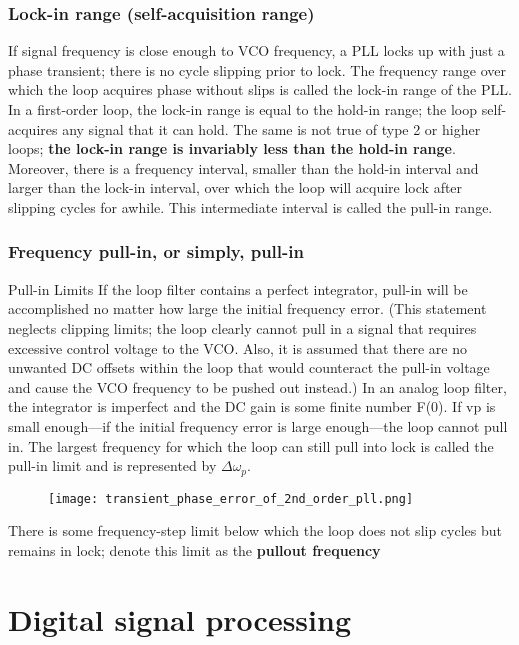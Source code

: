 \documentclass[a4paper]{article}
\begin{document}
\subsubsection{Lock-in range (self-acquisition range)}

If signal frequency is close enough to VCO frequency, a PLL locks up with
just a phase transient; there is no cycle slipping prior to lock. The frequency range over which the loop acquires phase without slips is called the lock-in range of the PLL. In a first-order loop, the lock-in range is equal to the hold-in range; the loop self-acquires any signal that it can hold. The same is not true of type 2 or higher loops; \textbf{the lock-in range is invariably less than the hold-in range}. Moreover, there is a frequency interval, smaller than the hold-in interval
and larger than the lock-in interval, over which the loop will acquire lock after slipping cycles for awhile. This intermediate interval is called the pull-in range.

\subsubsection{Frequency pull-in, or simply, pull-in}

Pull-in Limits If the loop filter contains a perfect integrator, pull-in will be accomplished no matter how large the initial frequency error. (This statement neglects clipping limits; the loop clearly cannot pull in a signal that requires excessive control voltage to the VCO. Also, it is assumed that there are no unwanted DC offsets within the loop that would counteract the pull-in voltage and cause the VCO frequency to be pushed out instead.) In an analog loop filter, the integrator is imperfect and the DC gain is some finite number F(0). If vp is small enough—if the initial frequency error is large enough—the loop cannot pull in. The largest frequency for which the loop can still pull into lock is called the pull-in limit and is represented by $\Delta\omega_p$.

\begin{figure}[h!]
	\centering
	\texttt{[image: transient\_phase\_error\_of\_2nd\_order\_pll.png]}
	\label{fig:transient_2nd_pll}
	\caption{\cite{Gardner}}
\end{figure}

There is some frequency-step limit below which the loop does not slip cycles but remains in lock; denote this limit as the \textbf{pullout frequency}

\section{Digital signal processing}
\end{document}
